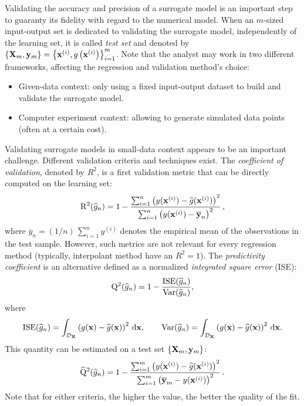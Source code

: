 Validating the accuracy and precision of a surrogate model is an important step to guaranty its fidelity with regard to the numerical model. 
When an $m$-sized input-output set is dedicated to validating the surrogate model, independently of the learning set, 
it is called \textit{test set} and denoted by $\left\{{\bf X}_m, {\bf y}_m\right\} = \left\{{\bf x}^{(i)}, g\left({\bf x}^{(i)}\right)\right\}_{i=1}^m$. 
Note that the analyst may work in two different frameworks, affecting the regression and validation method's choice: 
\begin{itemize}
    \item Given-data context: only using a fixed input-output dataset to build and validate the surrogate model. 
    \item Computer experiment context: allowing to generate simulated data points (often at a certain cost).
\end{itemize}

Validating surrogate models in small-data context appears to be an important challenge. 
Different validation criteria and techniques exist. 
The \textit{coefficient of validation}, denoted by $R^2$, is a first validation metric that can be directly computed on the learning set:
\begin{equation}
    \mathrm{R}^2(\widehat{g}_n) = 1 - \frac{ \sum_{i=1}^n  \left(y({\bf x}^{(i)}) - \widehat{g}({\bf x}^{(i)})\right)^2}{\sum_{i=1}^n \left(y({\bf x}^{(i)})-\overline{{\bf y}}_n\right)^2}\,,
\end{equation}
where $\overline{y}_n=(1/n)\,\sum_{i=1}^n y^{(i)}$ denotes the empirical mean of the observations in the test sample. 
However, such metrics are not relevant for every regression method (typically, interpolant method have an $R^2=1$). 
The \textit{predictivity coefficient} is an alternative defined as a normalized \textit{integrated square error} (ISE): 
\begin{equation}
    \mathrm{Q}^2(\widehat{g}_n) = 1 - \frac{\mathrm{ISE}(\widehat{g}_n)}{\operatorname{Var}(\widehat{g}_n)}, 
\end{equation} 
where 
\begin{equation}
    \mathrm{ISE}(\widehat{g}_n) = \int_{\mathcal{D}_{{\bf X}}} \left(g({\bf x}) - \widehat{g}({\bf x})\right)^2 \, \mathrm{d}{\bf x}, \qquad
    \operatorname{Var}(\widehat{g}_n) = \int_{\mathcal{D}_{{\bf X}}} \left(g({\bf x}) - \widehat{g}({\bf x})\right)^2 \, \mathrm{d}{\bf x}.
\end{equation}
This quantity can be estimated on a test set $\left\{{\bf X}_m, {\bf y}_m\right\}$: 
\begin{equation}
    \widehat{\mathrm{Q}}^2(\widehat{g}_n) = 1 - \frac{ \sum_{i=1}^m  \left(y({\bf x}^{(i)}) - \widehat{g}({\bf x}^{(i)})\right)^2}{\sum_{i=1}^m \left(\overline{{\bf y}}_m - y({\bf x}^{(i)})\right)^2}\,.
\end{equation}
Note that for either criteria, the higher the value, the better the quality of the fit. 

